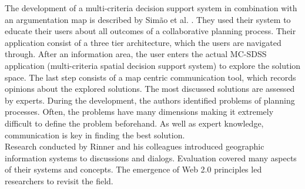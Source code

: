 The development of a multi-criteria decision support system in combination with an argumentation map is described by Sim\~{a}o et al. \cite{Simao2009Webbased}. They used their system to educate their users about all outcomes of a collaborative planning process. Their application consist of a three tier architecture, which the users are navigated through. After an information area, the user enters the actual MC-SDSS application (multi-criteria spatial decision support system) to explore the solution space. The last step consists of a map centric communication tool, which records opinions about the explored solutions. The most discussed solutions are assessed by experts. During the development, the authors identified problems of planning processes. Often, the problems have many dimensions making it extremely difficult to define the problem beforehand. As well as expert knowledge, communication is key in finding the best solution.\\
Research conducted by Rinner and his colleagues introduced geographic information systems to discussions and dialogs. Evaluation covered many aspects of their systems and concepts. The emergence of Web 2.0 principles led researchers to revisit the field.

